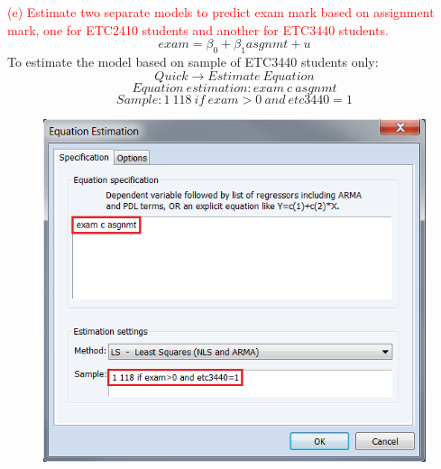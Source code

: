 \documentclass[12pt]{report}
\begin{document}
\newpage
\noindent \textcolor{red}{(e) Estimate two separate models to predict exam mark based on assignment mark, one for ETC2410 students and another for ETC3440 students.}
$$exam = \beta_0 + \beta_1asgnmt + u$$
\noindent To estimate the model  based on sample of ETC3440 students only:
$$Quick \to Estimate\ Equation$$
$$Equation\ estimation: exam\ c\ asgnmt$$
$$Sample: 1\ 118\ if\ exam>0\ and\ etc3440=1$$
\begin{figure}[H]
	\centering
	\includegraphics{q1_28}
\end{figure}
\vspace{-\baselineskip}
\end{document}
